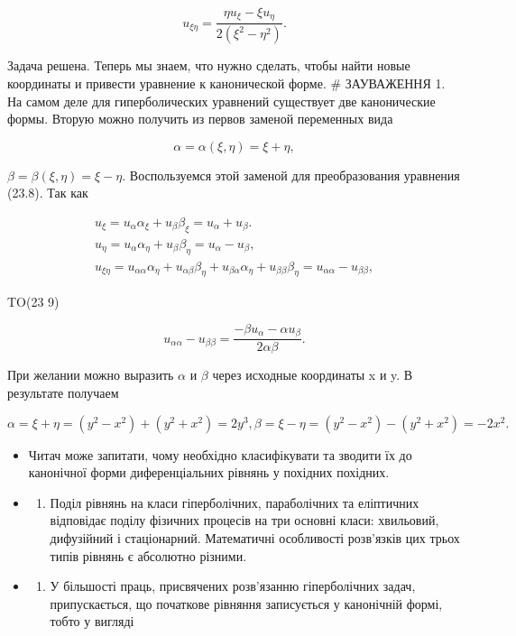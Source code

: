 \documentclass[
  ukrainian,
]{article}
\providecommand{\tightlist}{%
  \setlength{\itemsep}{0pt}\setlength{\parskip}{0pt}}
\begin{document}
\[
u_{\xi\eta} = \frac{\eta u_{\xi} - \xi u_{\eta}}{2(\xi^2 - \eta^2)}.
\]

Задача решена. Теперь мы знаем, что нужно сделать, чтобы найти новые
координаты и привести уравнение к канонической форме. \# ЗАУВАЖЕННЯ 1.
На самом деле для гиперболических уравнений существует две канонические
формы. Вторую можно получить из первов заменой переменных вида

\[
\alpha = \alpha (\xi, \eta) = \xi + \eta,
\]

\(\beta = \beta (\xi, \eta) = \xi - \eta.\) Воспользуемся этой заменой
для преобразования уравнения (23.8). Так как

\[
\begin{array}{l} u_{\xi} = u_{\alpha}\alpha_{\xi} + u_{\beta}\beta_{\xi} = u_{\alpha} + u_{\beta}. \\ u_{\eta} = u_{\alpha}\alpha_{\eta} + u_{\beta}\beta_{\eta} = u_{\alpha} - u_{\beta}, \\ u_{\xi\eta} = u_{\alpha\alpha}\alpha_{\eta} + u_{\alpha\beta}\beta_{\eta} + u_{\beta\alpha}\alpha_{\eta} + u_{\beta\beta}\beta_{\eta} = u_{\alpha\alpha} - u_{\beta\beta}, \end{array}
\]

TO(23 9)

\[
u_{\alpha\alpha} - u_{\beta\beta} = \frac{-\beta u_{\alpha} - \alpha u_{\beta}}{2\alpha\beta}.
\]

При желании можно выразить \(\alpha\) и \(\beta\) через исходные
координаты x и y. В результате получаем

\[
\alpha = \xi + \eta = (y^2 - x^2) + (y^2 + x^2) = 2y^3,
\beta = \xi - \eta = (y^2 - x^2) - (y^2 + x^2) = -2x^2.
\]

\begin{itemize}
\item
  Читач може запитати, чому необхідно класифікувати та зводити їх до
  канонічної форми диференціальних рівнянь у похідних похідних.
\item
  \begin{enumerate}
  \def\labelenumi{\alph{enumi})}
  \tightlist
  \item
    Поділ рівнянь на класи гіперболічних, параболічних та еліптичних
    відповідає поділу фізичних процесів на три основні класи: хвильовий,
    дифузійний і стаціонарний. Математичні особливості розв'язків цих
    трьох типів рівнянь є абсолютно різними.
  \end{enumerate}
\item
  \begin{enumerate}
  \def\labelenumi{\alph{enumi})}
  \setcounter{enumi}{1}
  \tightlist
  \item
    У більшості праць, присвячених розв'язанню гіперболічних задач,
    припускається, що початкове рівняння записується у канонічній формі,
    тобто у вигляді
  \end{enumerate}
\end{itemize}
\end{document}
